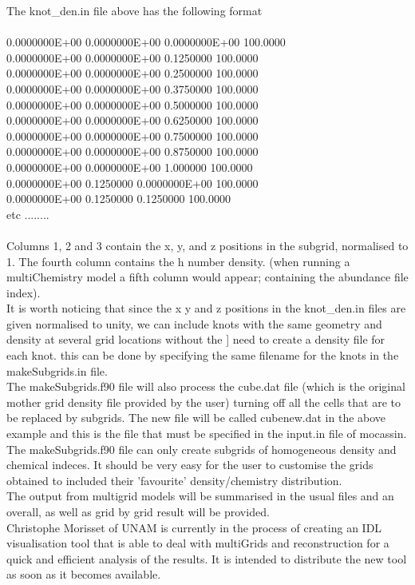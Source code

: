 \documentclass[11pt]{article}
\begin{document}
\noindent   The knot\_den.in file above has the following format\\
\\  
\indent   0.0000000E+00  0.0000000E+00  0.0000000E+00   100.0000\\
\indent   0.0000000E+00  0.0000000E+00  0.1250000       100.0000\\
\indent   0.0000000E+00  0.0000000E+00  0.2500000       100.0000\\
\indent   0.0000000E+00  0.0000000E+00  0.3750000       100.0000 \\
\indent   0.0000000E+00  0.0000000E+00  0.5000000       100.0000\\
\indent   0.0000000E+00  0.0000000E+00  0.6250000       100.0000\\
\indent   0.0000000E+00  0.0000000E+00  0.7500000       100.0000\\
\indent   0.0000000E+00  0.0000000E+00  0.8750000       100.0000\\
\indent   0.0000000E+00  0.0000000E+00   1.000000       100.0000\\
\indent   0.0000000E+00  0.1250000      0.0000000E+00   100.0000\\
\indent   0.0000000E+00  0.1250000      0.1250000       100.0000\\
\indent   etc ........\\
   \\
   Columns 1, 2 and 3 contain the x, y, and z positions in the subgrid, 
   normalised to 1. The fourth column contains the h number density. (when 
   running a multiChemistry model a fifth column would appear; containing 
   the abundance file index). \\
   It is worth noticing that since the x y and z positions
   in the knot\_den.in files are given normalised to unity, we can include knots 
   with the same geometry and density at several grid locations without the ]
   need to create a density file for each knot. this can be done by specifying the 
   same filename for the knots in the makeSubgrids.in file.  \\
   The makeSubgrids.f90 file will also process the cube.dat file (which is 
   the original mother grid density file provided by the user) turning off all 
   the cells that are to be replaced by subgrids. The new file will be called 
   cubenew.dat in the above example and this is the file that must be specified
   in the input.in file of mocassin. \\
   The makeSubgrids.f90 file can only create subgrids of homogeneous density and 
   chemical indeces. It should be very easy for the user to customise the grids
   obtained to included their 'favourite' density/chemistry distribution.\\
   The output from multigrid models will be summarised in the usual files and an 
   overall, as well as grid by grid result will be provided. \\
   Christophe Morisset of UNAM is currently in the process of creating an IDL 
   visualisation tool that is able to deal with multiGrids and reconstruction 
   for a quick and efficient analysis of the results. It is intended to distribute 
   the new tool as soon as it becomes available.\\
\end{document}
